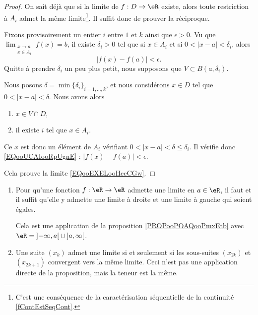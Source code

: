 \begin{proof}On sait déjà que si la limite de $f : D \to \eR$
    existe, alors toute restriction à $A_i$ admet la même limite\footnote{C'est une conséquence de la caractérisation séquentielle de la continuité \ref{fContEstSeqCont}.}. Il suffit donc de prouver la réciproque.

    Fixons provisoirement un entier \( i\) entre \( 1\) et \( k\) ainsi que \( \epsilon>0\). Vu que \( \lim_{\substack{x\to a\\x\in A_i}} f(x)=b\), il existe \( \delta_i>0\) tel que si \( x\in A_i\) et si \( 0<| x-a |<\delta_i\), alors
    \begin{equation}        \label{EQooUCAIooRpUgnE}
        | f(x)-f(a) |<\epsilon.
    \end{equation}
    Quitte à prendre \( \delta_i\) un peu plus petit, nous supposons que \( V\subset B(a,\delta_i)\).

    Nous posons $\delta = \min\{\delta_i\}_{i=1,\ldots, k}$, et nous considérons \( x\in D\) tel que \( 0<| x-a |<\delta\). Nous avons alors
  \begin{enumerate}
      \item \( x\in V\cap D\),
      \item il existe \( i\) tel que \( x\in A_i\).
  \end{enumerate}
  Ce \( x\) est donc un élément de \( A_i\) vérifiant \( 0<| x-a |<\delta\leq \delta_i\). Il vérifie donc \eqref{EQooUCAIooRpUgnE} : \( | f(x)-f(a) |<\epsilon\). 

  Cela prouve la limite \eqref{EQooEXELooHccCGw}.
\end{proof}

\begin{example}
  \begin{enumerate}
  \item Pour qu'une fonction $f : \eR \to \eR$ admette une limite en $a \in \eR$, il faut et il suffit qu'elle y admette une limite à droite et une limite à gauche qui soient égales.

  Cela est une application de la proposition \ref{PROPooPOAQooPmxEtb} avec \( \eR=\mathopen] -\infty , a \mathclose[\cup\mathopen] a , \infty \mathclose[\).

  \item Une suite $(x_k)$ admet une limite si et seulement si les
    sous-suites $(x_{2k})$ et $(x_{2k+1})$ convergent vers la même
    limite. Ceci n'est pas une application directe de la proposition,
    mais la teneur est la même.
  \end{enumerate}
\end{example}

